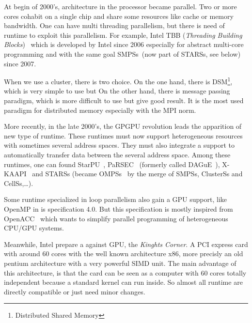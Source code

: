 At begin of 2000's, architecture in the processor became parallel.
%
Two or more cores cohabit on a single chip and share some resources like cache or memory bandwidth.
%
One can have multi threading parallelism, but there is need of runtime to exploit this parallelism.
%
For example, Intel TBB (\textit{Threading Building Blocks})~\cite{TBB} which is developed by Intel since 2006 especially for abstract multi-core programming and with the same goal SMPSs~\cite{SMPSs}(now part of STARSs, see below) since 2007.

When we use a cluster, there is two choice.
%
On the one hand, there is DSM\footnote{Distributed Shared Memory}, which is very simple to use but
%
On the other hand, there is message passing paradigm, which is more difficult to use but give good result.
%
It is the most used paradigm for distributed memory especially with the MPI norm.
%

More recently, in the late 2000's, the GPGPU revolution leads the apparition of new type of runtime.
%
These runtimes must now support heterogeneous resources with sometimes several address spaces.
%
They must also integrate a support to automatically transfer data between the several address space.
%
Among these runtimes, one can found StarPU~\cite{ATNW2011,Aug2011}, PaRSEC~\cite{PaRSEC} (formerly called DAGuE~\cite{DAGuE2012}), X-KAAPI~\cite{X-KAAPI} and STARSs (became OMPSs~\cite{OMPSs} by the merge of SMPSs, ClusterSs and CellSs,\dots).

Some runtime specialized in loop parallelism also gain a GPU support, like OpenMP in is specification 4.0.
%
But this specification is mostly inspired from OpenACC~\cite{OpenACC} which wants to simplify parallel programming of heterogeneous CPU/GPU systems.

Meanwhile, Intel prepare a against GPU, the {\em Kinghts Corner}.
%
A PCI express card with around 60 cores with the well known architecture x86, more precisly an old pentium architecture with a very powerful SIMD unit.
%
The main advantage of this architecture, is that the card can be seen as a computer with 60 cores totally independent because a standard kernel can run inside.
%
So almost all runtime are directly compatible or just need minor changes.



